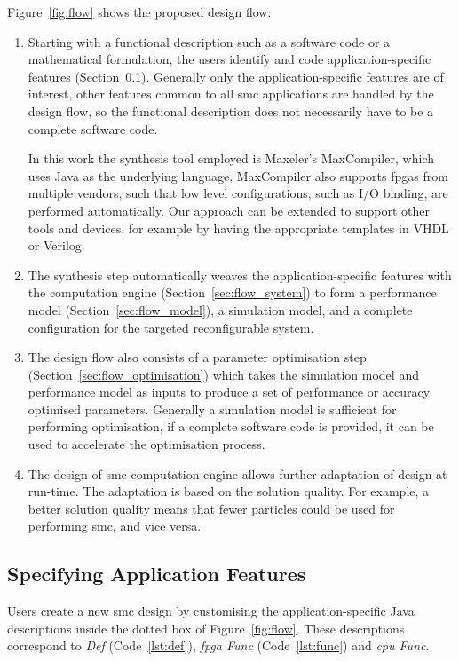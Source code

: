 Figure~\ref{fig:flow} shows the proposed design flow:

\begin{enumerate}
\item Starting with a functional description such as a software code or a mathematical formulation, the users identify and code application-specific features (Section~\ref{sec:flow_kernel}). 
Generally only the application-specific features are of interest, other features common to all \gls{smc} applications are handled by the design flow, so the functional description does not necessarily have to be a complete software code.

In this work the synthesis tool employed is Maxeler's MaxCompiler, which uses Java as the underlying language. 
MaxCompiler also supports \glspl{fpga} from multiple vendors, such that low level configurations, such as I/O binding, are performed automatically.
Our approach can be extended to support other tools and devices, for example by having the appropriate templates in VHDL or Verilog.
\item The synthesis step automatically weaves the application-specific features with the computation engine (Section~\ref{sec:flow_system}) to form a performance model (Section~\ref{sec:flow_model}), a simulation model, and a complete configuration for the targeted reconfigurable system.
\item The design flow also consists of a parameter optimisation step (Section~\ref{sec:flow_optimisation}) which takes the simulation model and performance model as inputs to produce a set of performance or accuracy optimised parameters.
Generally a simulation model is sufficient for performing optimisation, if a complete software code is provided, it can be used to accelerate the optimisation process.
\item The design of \gls{smc} computation engine allows further adaptation of design at run-time.
The adaptation is based on the solution quality.
For example, a better solution quality means that fewer particles could be used for performing \gls{smc}, and vice versa.
\end{enumerate}




\subsection{Specifying Application Features}
\label{sec:flow_kernel}

Users create a new \gls{smc} design by customising the application-specific Java descriptions inside the dotted box of Figure~\ref{fig:flow}.
These descriptions correspond to \textit{Def} (Code~\ref{lst:def}), \textit{\gls{fpga} Func} (Code~\ref{lst:func}) and \textit{\gls{cpu} Func}.

